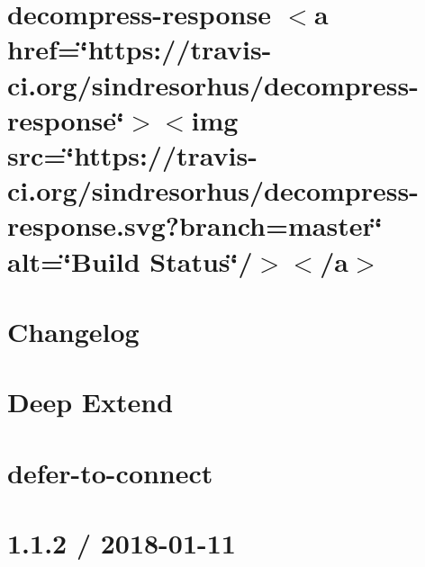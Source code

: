 \let\mypdfximage\pdfximage\def\pdfximage{\immediate\mypdfximage}\documentclass[twoside]{book}
\newcommand{\+}{\discretionary{\mbox{\scriptsize$\hookleftarrow$}}{}{}}
\begin{document}
\chapter{decompress-\/response $<$a href=\char`\"{}https\+://travis-\/ci.\+org/sindresorhus/decompress-\/response\char`\"{}$>$$<$img src=\char`\"{}https\+://travis-\/ci.\+org/sindresorhus/decompress-\/response.\+svg?branch=master\char`\"{} alt=\char`\"{}\+Build Status\char`\"{}/$>$$<$/a$>$}
\label{md__c_1__git_hub__p_r_o_y_e_c_t_o-_i_i_i-_g_o_t_rest-api_node_modules_decompress-response_readme}

\chapter{Changelog}
\label{md__c_1__git_hub__p_r_o_y_e_c_t_o-_i_i_i-_g_o_t_rest-api_node_modules_deep-extend__c_h_a_n_g_e_l_o_g}

\chapter{Deep Extend}
\label{md__c_1__git_hub__p_r_o_y_e_c_t_o-_i_i_i-_g_o_t_rest-api_node_modules_deep-extend__r_e_a_d_m_e}

\chapter{defer-\/to-\/connect}
\label{md__c_1__git_hub__p_r_o_y_e_c_t_o-_i_i_i-_g_o_t_rest-api_node_modules_defer-to-connect__r_e_a_d_m_e}

\chapter{1.1.2 / 2018-\/01-\/11}
\label{md__c_1__git_hub__p_r_o_y_e_c_t_o-_i_i_i-_g_o_t_rest-api_node_modules_depd__history}

\end{document}
